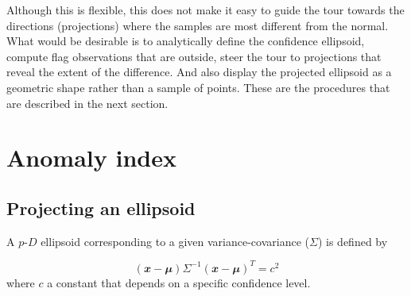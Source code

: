 \documentclass[
  12pt]{article}
\newcommand\pD{$p\text{-}D$}
\begin{document}
Although this is flexible, this does not make it easy to guide the tour
towards the directions (projections) where the samples are most
different from the normal. What would be desirable is to analytically
define the confidence ellipsoid, compute flag observations that are
outside, steer the tour to projections that reveal the extent of the
difference. And also display the projected ellipsoid as a geometric
shape rather than a sample of points. These are the procedures that are
described in the next section.

\section{Anomaly index}\label{sec-anomaly-index}

\subsection{Projecting an ellipsoid}\label{projecting-an-ellipsoid}

A \pD{} ellipsoid corresponding to a given variance-covariance
(\(\Sigma\)) is defined by

\[
(\mathbfit{x}-\mathbfit{\mu}) \Sigma^{-1}(\mathbfit{x}-\mathbfit{\mu})^T = c^2
\] where \(c\) a constant that depends on a specific confidence level.
\end{document}
